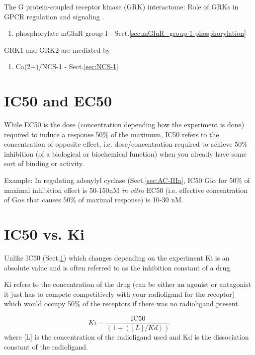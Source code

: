 The G protein-coupled receptor kinase (GRK) interactome: Role of GRKs in
GPCR regulation and signaling \citep{Ribas2007}. 

\begin{enumerate}
  \item phosphorylate mGluR group I - Sect.\ref{sec:mGluR_group-1-phosphorylation}
\end{enumerate}

GRK1 and GRK2 are mediated by
\begin{enumerate}
  \item Ca(2+)/NCS-1 - Sect.\ref{sec:NCS-1}
\end{enumerate}


\section{IC50 and EC50}
\label{sec:IC50}
\label{sec:EC50}


While EC50 is the dose (concentration depending how the experiment is done)
required to induce a response 50\% of the maximum,
IC50 refers to the concentration of opposite effect, i.e. dose/concentration
required to achieve 50\% inhibition (of a biological or biochemical function)
when you already have some sort of binding or activity.
 
Example: In regulating adenylyl cyclase (Sect.\ref{sec:AC-IIIa}, IC50 Gi$\alpha$
for 50\% of maximal inhibition effect is 50-150nM {\it in vitro} EC50 (i.e.
effective concentration of G$\alpha$s that causes 50\% of maximal response) is
10-30 nM.

\section{IC50 vs. Ki}
\label{sec:Ki}

Unlike IC50 (Sect.\ref{sec:IC50}) which changes depending on the experiment Ki
is an absolute value and is often referred to as the inhibition constant of a
drug. 

Ki refers to the concentration of the drug (can be either an agonist or
antagonist it just has to compete competitively with your radioligand for the
receptor) which would occupy 50\% of the receptors if there was no radioligand
present.

\begin{equation}
 Ki=\frac{\text{IC50}}{(1+([L]/Kd))}
\end{equation}
where [L] is the concentration of the radioligand used and Kd is the
dissociation constant of the radioligand.

